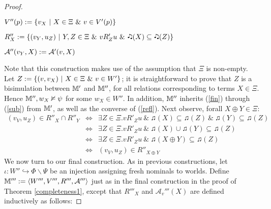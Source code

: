 \begin{proof}
\begin{itemizedot}
    \item $V'' (p) \assign \{v_X \  | \  X \in \Xi
    \  \& \  v \in V' (p)\}$
    
    \item $R''_X \assign \{(v_Y, u_Z) \  | \  Y, Z \in \Xi
    \  \& \  v R'_Z u \  \& \ 
    \twonotes (X) \subseteq \twonotes (Z)\}$
    
    \item $\mathcal{A}'' (v_Y, X) \assign \mathcal{A}' (v, X)$
  \end{itemizedot}
  Note that this construction makes use of the assumption that $\Xi$ is
  non-empty.  Let $Z \assign \{(v, v_X) \  | \  X \in \Xi
  \  \& \  v \in W' \}$; it is straightforward to prove
  that $Z$ is a bisimulation between $\mathbbm{M}'$ and $\mathbbm{M}''$, for
  all relations corresponding to terms $X \in \Xi$. Hence $\mathbbm{M}'', w_X
  \nvDash \psi$ for some $w_X \in W''$.  In addition, $\mathbbm{M}''$
  inherits (\ref{fin}) through (\ref{sub}) from $\mathbbm{M}'$, as well as the
  converse of (\ref{refl}).  Next observe, forall $X \oplus Y \in \Xi$:
  \begin{eqnarray*}
    \text{$(v_V, u_Z) \in R''_X \cap R''_Y$} & \Longleftrightarrow & \exists Z
    \in \Xi . \text{$v R'_Z u \  \& \  \twonotes (X)
    \subseteq \twonotes (Z) \  \& \  \twonotes (Y)
    \subseteq \twonotes (Z)$}\\
    & \Longleftrightarrow & \exists Z \in \Xi . \text{$v R'_Z u \ 
    \& \  \twonotes (X) \cup \twonotes (Y) \subseteq \twonotes
    (Z)$}\\
    & \Longleftrightarrow & \exists Z \in \Xi . \text{$v R'_Z u \ 
    \& \  \twonotes (X \oplus Y) \subseteq \twonotes (Z)$}\\
    & \Longleftrightarrow &  \text{$(v_V, u_Z) \in R''_{X \oplus Y}$}
  \end{eqnarray*}
  We now turn to our final construction. As in previous constructions, let
  $\iota : W'' \hookrightarrow \Phi \backslash \Psi$ be an injection assigning
  fresh nominals to worlds.  Define $\mathbbm{M}''' \assign \langle W''',
  V''', R''', \mathcal{A}''' \rangle$ just as in the final construction in the
  proof of Theorem \ref{completeness1}, except that $R'''_X$ and
  $\mathcal{A}_v''' (X)$ are defined inductively as follows:
  
  
  

\end{proof}
